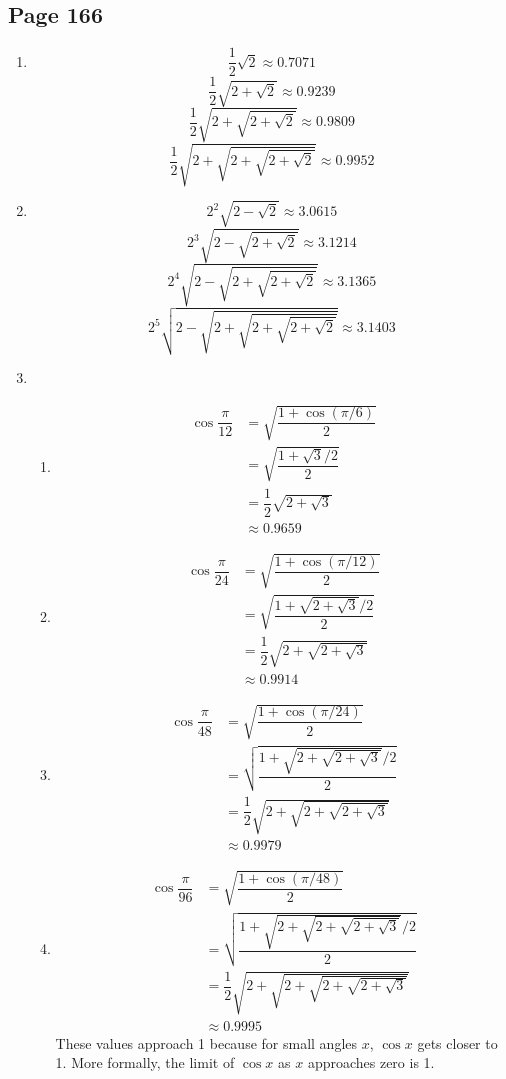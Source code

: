 \documentclass{article}
\newenvironment{solutions}[1]
{\subsection*{#1}
 \begin{enumerate}[leftmargin=1.5em]}
{\end{enumerate}}
\newcommand{\solution}{\item}
\newenvironment{subsolutions}
{\begin{enumerate}}
{\end{enumerate}}
\newcommand{\subsolution}{\item}
\begin{document}
\begin{solutions}{Page 166}
\solution %
\[
\dfrac{1}{2}\sqrt{2} \approx 0.7071
\]
\[
\dfrac{1}{2}\sqrt{2+\sqrt{2}} \approx 0.9239
\]
\[
\dfrac{1}{2}\sqrt{2+\sqrt{2+\sqrt{2}}} \approx 0.9809
\]
\[
\dfrac{1}{2}\sqrt{2+\sqrt{2+\sqrt{2+\sqrt{2}}}} \approx 0.9952
\]

\solution %
\[
2^2 \sqrt{2-\sqrt{2}} \approx 3.0615
\]
\[
2^3 \sqrt{2-\sqrt{2+\sqrt{2}}} \approx 3.1214
\]
\[
2^4 \sqrt{2-\sqrt{2+\sqrt{2+\sqrt{2}}}} \approx 3.1365
\]
\[
2^5 \sqrt{2-\sqrt{2+\sqrt{2+\sqrt{2+\sqrt{2}}}}} \approx 3.1403
\]

\solution %
\begin{subsolutions}
\subsolution %
\begin{align*}
\cos{\dfrac{\pi}{12}} &= \sqrt{\dfrac{1+\cos\left(\pi/6\right)}{2}} \\
&= \sqrt{\dfrac{1+\sqrt{3}/2}{2}} \\
&= \dfrac{1}{2}\sqrt{2+\sqrt{3}} \\
&\approx 0.9659
\end{align*}

\subsolution %
\begin{align*}
\cos{\dfrac{\pi}{24}} &= \sqrt{\dfrac{1+\cos\left(\pi/12\right)}{2}} \\
&= \sqrt{\dfrac{1+\sqrt{2+\sqrt{3}}/2}{2}} \\
&= \dfrac{1}{2}\sqrt{2+\sqrt{2+\sqrt{3}}} \\
&\approx 0.9914
\end{align*}

\subsolution %
\begin{align*}
\cos{\dfrac{\pi}{48}} &= \sqrt{\dfrac{1+\cos\left(\pi/24\right)}{2}} \\
&= \sqrt{\dfrac{1+\sqrt{2+\sqrt{2+\sqrt{3}}}/2}{2}} \\
&= \dfrac{1}{2}\sqrt{2+\sqrt{2+\sqrt{2+\sqrt{3}}}} \\
&\approx 0.9979
\end{align*}

\subsolution %
\begin{align*}
\cos{\dfrac{\pi}{96}} &= \sqrt{\dfrac{1+\cos\left(\pi/48\right)}{2}} \\
&= \sqrt{\dfrac{1+\sqrt{2+\sqrt{2+\sqrt{2+\sqrt{3}}}}/2}{2}} \\
&= \dfrac{1}{2}\sqrt{2+\sqrt{2+\sqrt{2+\sqrt{2+\sqrt{3}}}}} \\
&\approx 0.9995
\end{align*}
These values approach 1 because for small angles $x$, $\cos{x}$ gets closer to 1. More formally, the limit of $\cos{x}$ as $x$ approaches zero is 1.
\end{subsolutions}


\end{solutions}
\end{document}
